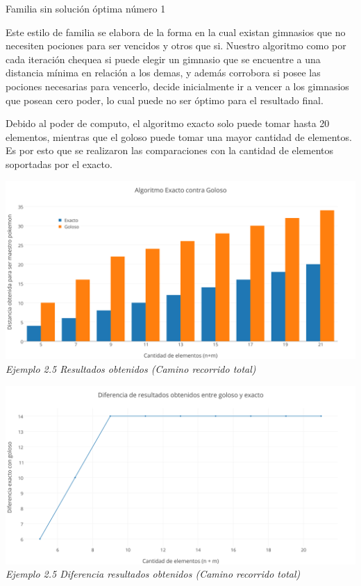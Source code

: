 \begin{center}
Familia sin soluci\'on \'optima n\'umero 1
\end{center}

Este estilo de familia se elabora de la forma en la cual existan gimnasios que no necesiten pociones para ser vencidos y otros que si. Nuestro algoritmo como por cada iteraci\'on chequea si puede elegir un gimnasio que se encuentre a una distancia m\'inima en relaci\'on a los demas, y adem\'as corrobora si posee las pociones necesarias para vencerlo, decide inicialmente ir a vencer a los gimnasios que posean cero poder, lo cual puede no ser \'optimo para el resultado final.

Debido al poder de computo, el algoritmo exacto solo puede tomar hasta 20 elementos, mientras que el goloso puede tomar una mayor cantidad de elementos. Es por esto que se realizaron las comparaciones con la cantidad de elementos soportadas por el exacto.

\vspace*{0.3cm} \vspace*{0.3cm}
  \begin{center}
\includegraphics[scale=0.5]{./EJ2/algungym0.png}
\\{\textit{Ejemplo 2.5 Resultados obtenidos (Camino recorrido total) }}
  \end{center}
  \vspace*{0.3cm}

\vspace*{0.3cm} \vspace*{0.3cm}
  \begin{center}
\includegraphics[scale=0.5]{./EJ2/Diferenciagym0.png}
\\{\textit{Ejemplo 2.5 Diferencia resultados obtenidos (Camino recorrido total) }}
  \end{center}
  \vspace*{0.3cm}


